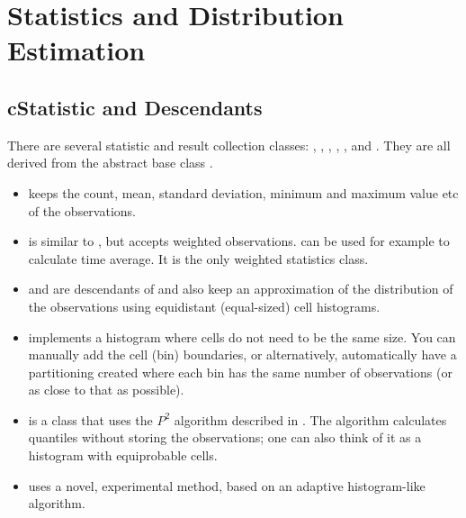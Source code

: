 \section{Statistics and Distribution Estimation}
\label{sec:sim-lib:statistics}

\subsection{cStatistic and Descendants}
\label{sec:sim-lib:cstatistic-and-descendants}

There are several statistic and result collection classes:
, , ,
, ,  and
. They are all derived from the abstract base class
.

\begin{itemize}
  \item{ keeps the count, mean, standard
    deviation, minimum and maximum value etc of the observations.}
  \item{ is similar to , but
    accepts weighted observations.  can be used
    for example to calculate time average. It is the only weighted
    statistics class.}
  \item{ and  are
    descendants of  and also keep an approximation of
    the distribution of the observations using equidistant
    (equal-sized) cell histograms.}
  \item{ implements a histogram where cells do not
    need to be the same size. You can manually add the cell (bin)
    boundaries, or alternatively, automatically have a partitioning
    created where each bin has the same number of observations (or as
    close to that as possible).}
  \item{ is a class that uses the $P^{2}$ algorithm
    described in \cite{JCh85}. The algorithm calculates quantiles without
    storing the observations; one can also think of it as a histogram
    with equiprobable cells.}
  \item{ uses a novel, experimental method, based on an
    adaptive histogram-like algorithm.}
\end{itemize}

